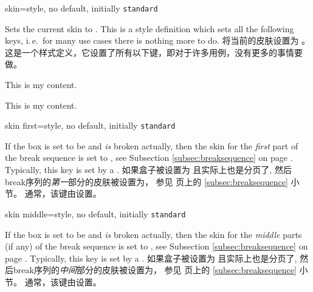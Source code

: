 \begin{docTcbKey}{skin}{=}{style, no default, initially \texttt{standard}}
\begin{stripedbox}
Sets the current skin to . This is a style definition which sets all the following
keys, i.\,e.\ for many use cases there is nothing more to do.
\tcblower
将当前的皮肤设置为 。这是一个样式定义，它设置了所有以下键，即对于许多用例，没有更多的事情要做。
\end{stripedbox}

\begin{dispExample}

\begin{tcolorbox}[adjusted title=adjusted皮肤]
  This is my content.
\end{tcolorbox}
\begin{tcolorbox}[beamer,adjusted title=beamer皮肤]
  This is my content.
\end{tcolorbox}
\end{dispExample}
\end{docTcbKey}


  \begin{docTcbKey}{skin first}{=}{style, no default, initially \texttt{standard}}
\begin{stripedbox}
If the box is set to be  and \emph{is} broken actually,
then the skin for the \emph{first} part of the break sequence
is set to , see Subsection \ref{subsec:breaksequence} on page \pageref{subsec:breaksequence}.
Typically, this key is set by a .
\tcblower
如果盒子被设置为 且实际上也是分页了,%
然后break序列的\emph{第一}部分的皮肤被设置为，
参见 \pageref{subsec:breaksequence} 页上的 \ref{subsec:breaksequence} 小节。
通常，该键由设置。
\end{stripedbox}
\end{docTcbKey}


\begin{docTcbKey}{skin middle}{=}{style, no default, initially \texttt{standard}}
\begin{stripedbox}
If the box is set to be  and \emph{is} broken actually,
then the skin for the \emph{middle} parts (if any) of the break sequence
is set to , see Subsection \ref{subsec:breaksequence} on page \pageref{subsec:breaksequence}.
Typically, this key is set by a .
\tcblower
如果盒子被设置为 且实际上也是分页了,%
然后break序列的\emph{中间}部分的皮肤被设置为，
参见 \pageref{subsec:breaksequence} 页上的 \ref{subsec:breaksequence} 小节。
通常，该键由设置。
\end{stripedbox}
\end{docTcbKey}


